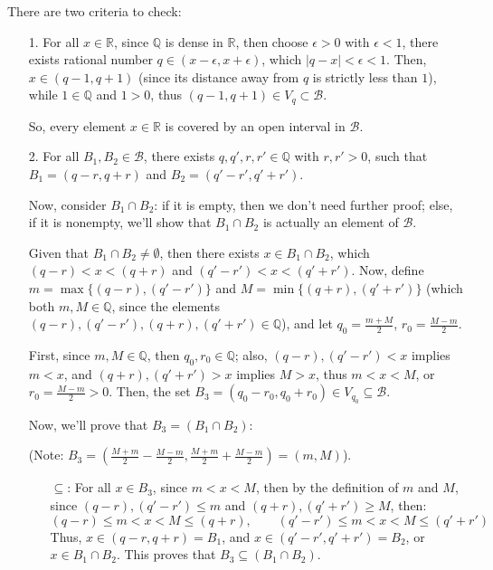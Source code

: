 \documentclass{article}
\begin{document}
There are two criteria to check:
\begin{itemize}
    \item[1.] For all $x\in\mathbb{R}$, since $\mathbb{Q}$ is dense in $\mathbb{R}$, then choose $\epsilon>0$ with $\epsilon <1$,
    there exists rational number $q\in (x-\epsilon,x+\epsilon)$, which $|q-x|<\epsilon<1$.
    Then, $x\in (q-1,q+1)$ (since its distance away from $q$ is strictly less than $1$), while $1\in \mathbb{Q}$ and $1>0$,
    thus $(q-1,q+1)\in V_q \subset \mathcal{B}$.

    So, every element $x\in\mathbb{R}$ is covered by an open interval in $\mathcal{B}$.

    \hfill

    \item[2.] For all $B_1,B_2\in\mathcal{B}$, there exists $q,q',r,r'\in \mathbb{Q}$ with $r,r'>0$, 
    such that $B_1=(q-r,q+r)$ and $B_2=(q'-r',q'+r')$.

    Now, consider $B_1\cap B_2$: if it is empty, then we don't need further proof;
    else, if it is nonempty, we'll show that $B_1\cap B_2$ is actually an element of $\mathcal{B}$.

    Given that $B_1\cap B_2\neq \emptyset$, then there exists $x\in B_1\cap B_2$, which $(q-r)<x<(q+r)$ and $(q'-r')<x<(q'+r')$.
    Now, define $m=\max\{(q-r),(q'-r')\}$ and $M=\min\{(q+r),(q'+r')\}$ (which both $m,M\in \mathbb{Q}$, since the elements $(q-r),(q'-r'),(q+r),(q'+r')\in\mathbb{Q}$),
    and let $q_0=\frac{m+M}{2}$, $r_0=\frac{M-m}{2}$.

    \hfill

    First, since $m,M\in\mathbb{Q}$, then $q_0,r_0\in\mathbb{Q}$; 
    also, $(q-r),(q'-r')<x$ implies $m <x$, and $(q+r),(q'+r')>x$ implies $M>x$, thus $m<x<M$, or $r_0=\frac{M-m}{2}>0$.
    Then, the set $B_3 = (q_0-r_0,q_0+r_0)\in V_{q_0}\subseteq\mathcal{B}$.

    Now, we'll prove that $B_3 = (B_1\cap B_2)$:

    (Note: $B_3 = (\frac{M+m}{2}-\frac{M-m}{2},\frac{M+m}{2}+\frac{M-m}{2}) = (m,M)$).
    \begin{itemize}
        \item[$\subseteq$:] For all $x\in B_3$, since $m<x<M$, then by the definition of $m$ and $M$,
        since $(q-r),(q'-r')\leq m$ and $(q+r),(q'+r')\geq M$, then:
        $$(q-r)\leq m<x<M\leq(q+r),\quad\quad (q'-r')\leq m<x<M\leq(q'+r')$$
        Thus, $x\in (q-r,q+r)=B_1$, and $x\in (q'-r',q'+r')=B_2$, or $x\in B_1\cap B_2$.
        This proves that $B_3\subseteq (B_1\cap B_2)$.


\end{itemize}
\end{itemize}
\end{document}
